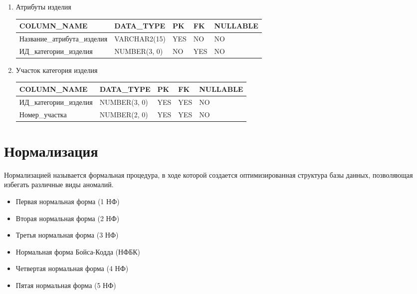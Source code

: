 \begin{enumerate}
    \item{Атрибуты изделия}

    \begin{tabular}{|p{4cm}|p{3cm}|p{1cm}|p{1cm}|p{2cm}|} \hline

        {\bf COLUMN\_NAME} & {\bf DATA\_TYPE} & {\bf PK} & {\bf FK} & {\bf NULLABLE} \\ \hline
        Название\_атрибута\_изделия & VARCHAR2(15) & YES & NO & NO \\ \hline
        ИД\_категории\_изделия & NUMBER(3, 0) & NO & YES & NO \\ \hline

    \end{tabular}

    \item Участок категория изделия

    \begin{tabular}{|p{4cm}|p{3cm}|p{1cm}|p{1cm}|p{2cm}|} \hline

        {\bf COLUMN\_NAME} & {\bf DATA\_TYPE} & {\bf PK} & {\bf FK} & {\bf NULLABLE} \\ \hline
        ИД\_категории\_изделия & NUMBER(3, 0) & YES & YES & NO \\ \hline
        Номер\_участка & NUMBER(2, 0) & YES & YES & NO \\ \hline

    \end{tabular}

\end{enumerate}

\section {Нормализация}
Нормализацией называется формальная процедура, в ходе которой создается оптимизированная структура базы данных, позволяющая избегать различные виды аномалий.

\begin{itemize}
    \item Первая нормальная форма (1 НФ)
    \item Вторая нормальная форма (2 НФ)
    \item Третья нормальная форма (3 НФ)
    \item Нормальная форма Бойса-Кодда (НФБК)
    \item Четвертая нормальная форма (4 НФ)
    \item Пятая нормальная форма (5 НФ)
\end{itemize}

